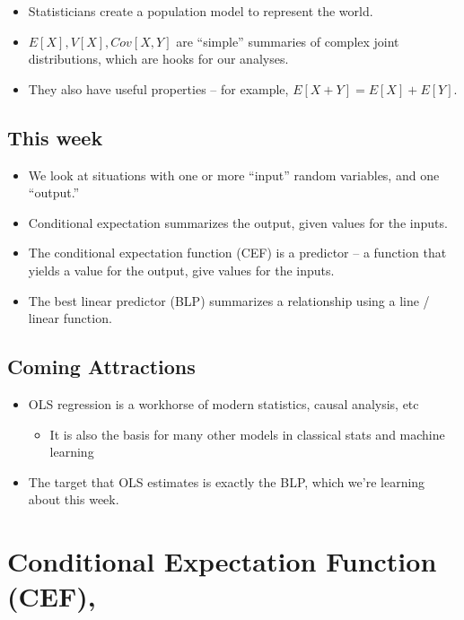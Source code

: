 \documentclass[
]{book}
\providecommand{\tightlist}{%
  \setlength{\itemsep}{0pt}\setlength{\parskip}{0pt}}
\theoremstyle{definition}
\theoremstyle{definition}
\theoremstyle{definition}
\theoremstyle{definition}
\theoremstyle{remark}
\begin{document}
\begin{itemize}
\tightlist
\item
  Statisticians create a population model to represent the world.
\item
  \(E[X], V[X], Cov[X,Y]\) are ``simple'' summaries of complex joint distributions, which are hooks for our analyses.
\item
  They also have useful properties -- for example, \(E[X + Y] = E[X] + E[Y]\).
\end{itemize}

\hypertarget{this-week}{%
\subsection{This week}\label{this-week}}

\begin{itemize}
\tightlist
\item
  We look at situations with one or more ``input'' random variables, and one ``output.''
\item
  Conditional expectation summarizes the output, given values for the inputs.
\item
  The conditional expectation function (CEF) is a predictor -- a function that yields a value for the output, give values for the inputs.
\item
  The best linear predictor (BLP) summarizes a relationship using a line / linear function.
\end{itemize}

\hypertarget{coming-attractions}{%
\subsection{Coming Attractions}\label{coming-attractions}}

\begin{itemize}
\tightlist
\item
  OLS regression is a workhorse of modern statistics, causal analysis, etc

  \begin{itemize}
  \tightlist
  \item
    It is also the basis for many other models in classical stats and machine learning
  \end{itemize}
\item
  The target that OLS estimates is exactly the BLP, which we're learning about this week.
\end{itemize}

\hypertarget{conditional-expectation-function-cef}{%
\section{Conditional Expectation Function (CEF),}\label{conditional-expectation-function-cef}}
\end{document}
